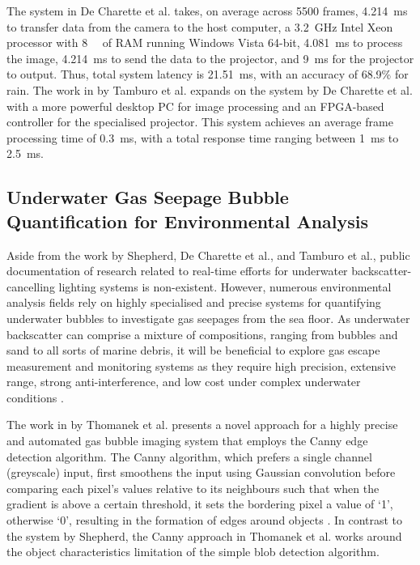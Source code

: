 The system in De Charette et al. takes, on average across 5500 frames, \SI{4.214}{\milli\second} to transfer data from the camera to the host computer, a \SI{3.2}{\giga\hertz} Intel Xeon processor with \SI{8}{\giga\byte} of RAM running Windows Vista 64-bit, \SI{4.081}{\milli\second} to process the image, \SI{4.214}{\milli\second} to send the data to the projector, and \SI{9}{\milli\second} for the projector to output. Thus, total system latency is \SI{21.51}{\milli\second}, with an accuracy of 68.9\% for rain. The work in \cite{tamburoProgrammableAutomotiveHeadlights2014} by Tamburo et al. expands on the system by De Charette et al. with a more powerful desktop PC for image processing and an FPGA-based controller for the specialised projector. This system achieves an average frame processing time of \SI{0.3}{\milli\second}, with a total response time ranging between \SI{1}{\milli\second} to \SI{2.5}{\milli\second}.

\subsection{Underwater Gas Seepage Bubble Quantification for Environmental Analysis}
\label{gasquant}

Aside from the work by Shepherd, De Charette et al., and Tamburo et al., public documentation of research related to real-time efforts for underwater backscatter-cancelling lighting systems is non-existent. However, numerous environmental analysis fields rely on highly specialised and precise systems for quantifying underwater bubbles to investigate gas seepages from the sea floor. As underwater backscatter can comprise a mixture of compositions, ranging from bubbles and sand to all sorts of marine debris, it will be beneficial to explore gas escape measurement and monitoring systems as they require high precision, extensive range, strong anti-interference, and low cost under complex underwater conditions \cite{zhangUnderwaterBubbleEscape2023}.

The work in \cite{thomanekAutomatedGasBubble2010} by Thomanek et al. presents a novel approach for a highly precise and automated gas bubble imaging system that employs the Canny edge detection algorithm. The Canny algorithm, which prefers a single channel (greyscale) input, first smoothens the input using Gaussian convolution before comparing each pixel's values relative to its neighbours such that when the gradient is above a certain threshold, it sets the bordering pixel a value of `1', otherwise `0', resulting in the formation of edges around objects \cite{cannyComputationalApproachEdge1986a}. In contrast to the system by Shepherd, the Canny approach in Thomanek et al. works around the object characteristics limitation of the simple blob detection algorithm.

